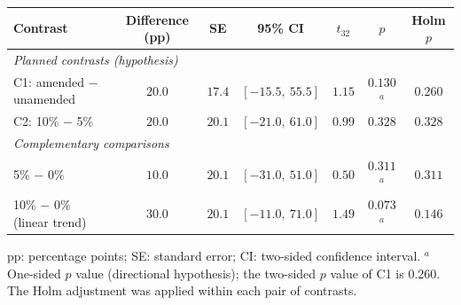\begin{tabular}{lcccccc}
\hline\hline
\textbf{Contrast} & \textbf{Difference (pp)} & \textbf{SE} & \textbf{95\% CI} & \textbf{$t_{32}$} & \textbf{$p$} & \textbf{Holm $p$} \\
\hline
\multicolumn{7}{l}{\textit{Planned contrasts (hypothesis)}} \\
C1: amended $-$ unamended & $20.0$ & $17.4$ & $[-15.5,\ 55.5]$ & $1.15$ & $0.130$$^{a}$ & $0.260$ \\
C2: 10\% $-$ 5\% & $20.0$ & $20.1$ & $[-21.0,\ 61.0]$ & $0.99$ & $0.328$ & $0.328$ \\
\hline
\multicolumn{7}{l}{\textit{Complementary comparisons}} \\
5\% $-$ 0\% & $10.0$ & $20.1$ & $[-31.0,\ 51.0]$ & $0.50$ & $0.311$$^{a}$ & $0.311$ \\
10\% $-$ 0\% (linear trend) & $30.0$ & $20.1$ & $[-11.0,\ 71.0]$ & $1.49$ & $0.073$$^{a}$ & $0.146$ \\
\hline
\end{tabular}
\par\vspace{4pt}
\parbox{0.94\linewidth}{\footnotesize pp: percentage points; SE: standard error; CI: two-sided confidence interval. $^{a}$One-sided $p$ value (directional hypothesis); the two-sided $p$ value of C1 is 0.260. The Holm adjustment was applied within each pair of contrasts.}
